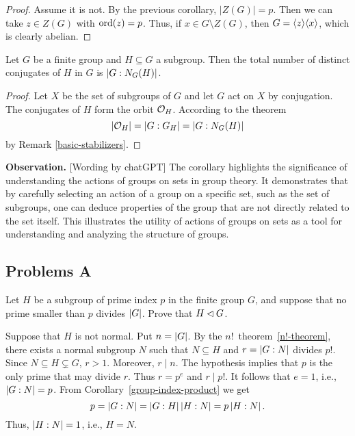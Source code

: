 \begin{proof} Assume it is not. By the previous corollary, $|Z(G)|=p$. Then we can take $z\in Z(G)$ with ${\rm ord}(z)=p$. Thus, if $x\in G\setminus Z(G)$, then $G=\langle z\rangle\langle x\rangle$, which is clearly abelian.  \end{proof}
 
\begin{cor}\label{conjugate-count}
    Let\/ $G$ be a finite group and\/ $H \subseteq G$ a subgroup. Then the total number of distinct conjugates of\/ $H$ in\/ $G$ is\/ $\left\vert{G : N_G(H)}\right\vert$.
\end{cor}

\begin{proof} Let $X$ be the set of subgroups of\/ $G$ and let $G$ act on $X$ by conjugation. The conjugates of\/ $H$ form the orbit\/ ${\cal O}_H$. According to the theorem
$$
    \left\vert{{\cal O}_H}\right\vert=|G:G_H|=|G:N_G(H)|
$$
by Remark \ref{basic-stabilizers}.  \end{proof}

\textbf{Observation.} {[\rm Wording by chatGPT]} The corollary highlights the significance of understanding the actions of groups on sets in group theory. It demonstrates that by carefully selecting an action of a group on a specific set, such as the set of subgroups, one can deduce properties of the group that are not directly related to the set itself. This illustrates the utility of actions of groups on sets as a tool for understanding and analyzing the structure of groups.

\subsection{Problems A}

\begin{probl}\label{problem-1.A.1}
    Let $H$ be a subgroup of prime index $p$ in the finite group $G$, and suppose that no prime smaller than\/ $p$ divides $\left\vert{G}\right\vert$. Prove that $H\lhd G$.
\end{probl}

\begin{solution} Suppose that $H$ is not normal. Put $n=\left\vert{G}\right\vert$. By the $n!$~theorem~\ref{n!-theorem}, there exists a normal subgroup $N$ such that $N\subseteq H$ and $r=\left\vert{G:N}\right\vert$ divides $p!$. Since $N\subseteq H\varsubsetneq G$, $r>1$. Moreover, $r\mid n$. The hypothesis implies that $p$ is the only prime that may divide $r$. Thus $r=p^e$ and $r\mid p!$. It follows that $e=1$, i.e., $\left\vert{G: N}\right\vert=p$. From Corollary~\ref{group-index-product} we get
$$
    p=\left\vert{G:N}\right\vert=\left\vert{G:H}\right\vert\left\vert{H:N}\right\vert= p\left\vert{H:N}\right\vert.
$$
Thus, $\left\vert{H:N}\right\vert=1$, i.e., $H=N$.  \end{solution}

